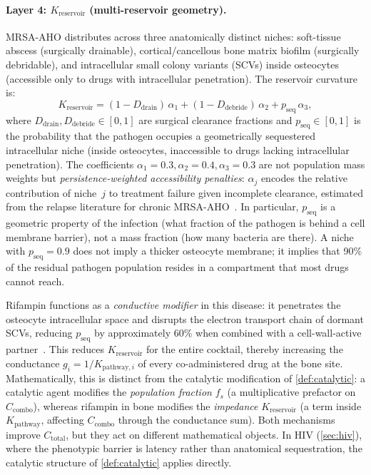 \documentclass[11pt]{article}
\theoremstyle{plain}
\theoremstyle{definition}
\newcommand{\Kpath}{K_{\mathrm{pathway}}}
\newcommand{\Kres}{K_{\mathrm{reservoir}}}
\newcommand{\Ccombo}{C_{\mathrm{combo}}}
\begin{document}
\paragraph{Layer 4: $\Kres$ (multi-reservoir geometry).}
MRSA-AHO distributes across three anatomically distinct niches:
soft-tissue abscess (surgically drainable), cortical/cancellous
bone matrix biofilm (surgically debridable), and intracellular
small colony variants (SCVs) inside osteocytes (accessible only
to drugs with intracellular penetration). The reservoir curvature
is:
\begin{equation}
  \label{eq:k-reservoir}
  \Kres = (1 - D_{\mathrm{drain}}) \, \alpha_1
    + (1 - D_{\mathrm{debride}}) \, \alpha_2
    + p_{\mathrm{seq}} \, \alpha_3,
\end{equation}
where $D_{\mathrm{drain}}, D_{\mathrm{debride}} \in [0, 1]$ are
surgical clearance fractions and $p_{\mathrm{seq}} \in [0, 1]$ is
the probability that the pathogen occupies a geometrically
sequestered intracellular niche (inside osteocytes, inaccessible to
drugs lacking intracellular penetration). The coefficients
$\alpha_1 = 0.3, \alpha_2 = 0.4, \alpha_3 = 0.3$ are not
population mass weights but \emph{persistence-weighted accessibility
penalties}: $\alpha_j$ encodes the relative contribution of
niche~$j$ to treatment failure given incomplete clearance, estimated
from the relapse literature for chronic MRSA-AHO~\cite{Arnold2006}.
In particular, $p_{\mathrm{seq}}$ is a geometric property of the
infection (what fraction of the pathogen is behind a cell membrane
barrier), not a mass fraction (how many bacteria are there). A
niche with $p_{\mathrm{seq}} = 0.9$ does not imply a thicker
osteocyte membrane; it implies that 90\% of the residual pathogen
population resides in a compartment that most drugs cannot reach.

Rifampin functions as a \emph{conductive modifier} in this disease:
it penetrates the osteocyte intracellular space and disrupts the
electron transport chain of dormant SCVs, reducing
$p_{\mathrm{seq}}$ by approximately 60\% when combined with a
cell-wall-active partner~\cite{Zimmerli1998, Baldoni2009}. This
reduces $\Kres$ for the entire cocktail, thereby increasing the
conductance $g_i = 1/K_{\mathrm{pathway},i}$ of every co-administered drug at
the bone site. Mathematically, this is distinct from the catalytic
modification of \cref{def:catalytic}: a catalytic agent modifies
the \emph{population fraction} $f_s$ (a multiplicative prefactor
on $\Ccombo$), whereas rifampin in bone modifies the
\emph{impedance} $\Kres$ (a term inside $\Kpath$, affecting
$\Ccombo$ through the conductance sum). Both mechanisms improve
$C_{\mathrm{total}}$, but they act on different mathematical
objects. In HIV (\cref{sec:hiv}), where the phenotypic barrier is
latency rather than anatomical sequestration, the catalytic
structure of \cref{def:catalytic} applies directly.
\end{document}
